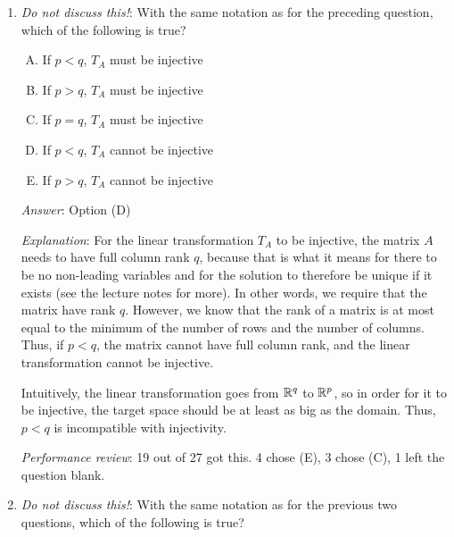 \documentclass[10pt]{amsart}
\begin{document}
\begin{enumerate}
  {\em Answer}: Option (B)

  {\em Explanation}: The way matrix-vector multiplication works, a $p
  \times q$ matrix multiplies with a $q \times 1$ vector to give a $p
  \times 1$ vector. Thus the linear transformation takes as input a
  $q$-dimensional vector and gives as output a $p$-dimensional vector,
  and is hence a transformation from $\R^q$ to $\R^p$.

  {\em Performance review}: 22 out of 27 got this. 3 chose (A), 2 chose (C).

\item {\em Do not discuss this!}: With the same notation as for the
  preceding question, which of the following is true?

  \begin{enumerate}[(A)]
  \item If $p < q$, $T_A$ must be injective
  \item If $p > q$, $T_A$ must be injective
  \item If $p = q$, $T_A$ must be injective
  \item If $p < q$, $T_A$ cannot be injective
  \item If $p > q$, $T_A$ cannot be injective
  \end{enumerate}

  {\em Answer}: Option (D)

  {\em Explanation}: For the linear transformation $T_A$ to be
  injective, the matrix $A$ needs to have full column rank $q$,
  because that is what it means for there to be no non-leading
  variables and for the solution to therefore be unique if it exists
  (see the lecture notes for more). In other words, we require that
  the matrix have rank $q$. However, we know that the rank of a matrix
  is at most equal to the minimum of the number of rows and the number
  of columns. Thus, if $p < q$, the matrix cannot have full column
  rank, and the linear transformation cannot be injective.

  Intuitively, the linear transformation goes from $\R^q$ to $\R^p$,
  so in order for it to be injective, the target space should be at
  least as big as the domain. Thus, $p < q$ is incompatible with
  injectivity.

  {\em Performance review}: 19 out of 27 got this. 4 chose (E), 3
  chose (C), 1 left the question blank.

\item {\em Do not discuss this!}: With the same notation as for the
  previous two questions, which of the following is true?


\end{enumerate}
\end{document}
